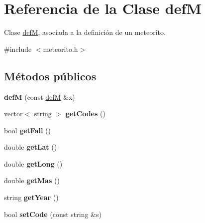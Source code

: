 \hypertarget{classdefM}{\section{\-Referencia de la \-Clase def\-M}
\label{classdefM}
}


\-Clase \hyperlink{classdefM}{def\-M}, asociada a la definición de un meteorito.  




{\ttfamily \#include $<$meteorito.\-h$>$}

\subsection*{\-Métodos públicos}
\begin{DoxyCompactItemize}
\item 
\hypertarget{classdefM_a8256dc221b6f796e1bb6520063c801e6}{{\bfseries def\-M} (const \hyperlink{classdefM}{def\-M} \&x)}\label{classdefM_a8256dc221b6f796e1bb6520063c801e6}

\item 
\hypertarget{classdefM_a2eba9a6e331f7dd966850378e657e717}{vector$<$ string $>$ {\bfseries get\-Codes} ()}\label{classdefM_a2eba9a6e331f7dd966850378e657e717}

\item 
\hypertarget{classdefM_ac4b0001e8a9dee99def85c2037563161}{bool {\bfseries get\-Fall} ()}\label{classdefM_ac4b0001e8a9dee99def85c2037563161}

\item 
\hypertarget{classdefM_a46460f47d0d051fb47cc8a4cc3b1e51d}{double {\bfseries get\-Lat} ()}\label{classdefM_a46460f47d0d051fb47cc8a4cc3b1e51d}

\item 
\hypertarget{classdefM_a35962a1e2c8a28da950d4cdb7575689b}{double {\bfseries get\-Long} ()}\label{classdefM_a35962a1e2c8a28da950d4cdb7575689b}

\item 
\hypertarget{classdefM_ad289db897bed43977727d3a9cca9a673}{double {\bfseries get\-Mas} ()}\label{classdefM_ad289db897bed43977727d3a9cca9a673}

\item 
\hypertarget{classdefM_ae2758bc83256eafcf74a073dde0dbcf9}{string {\bfseries get\-Year} ()}\label{classdefM_ae2758bc83256eafcf74a073dde0dbcf9}

\item 
\hypertarget{classdefM_acfda55375efd2a0e41245d20eaa0ec12}{bool {\bfseries set\-Code} (const string \&s)}\label{classdefM_acfda55375efd2a0e41245d20eaa0ec12}


\end{DoxyCompactItemize}
